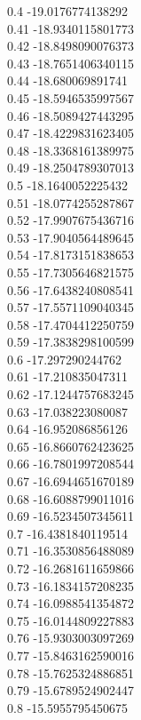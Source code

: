 {0.4	-19.0176774138292\\
0.41	-18.9340115801773\\
0.42	-18.8498090076373\\
0.43	-18.7651406340115\\
0.44	-18.680069891741\\
0.45	-18.5946535997567\\
0.46	-18.5089427443295\\
0.47	-18.4229831623405\\
0.48	-18.3368161389975\\
0.49	-18.2504789307013\\
0.5	-18.1640052225432\\
0.51	-18.0774255287867\\
0.52	-17.9907675436716\\
0.53	-17.9040564489645\\
0.54	-17.8173151838653\\
0.55	-17.7305646821575\\
0.56	-17.6438240808541\\
0.57	-17.5571109040345\\
0.58	-17.4704412250759\\
0.59	-17.3838298100599\\
0.6	-17.297290244762\\
0.61	-17.210835047311\\
0.62	-17.1244757683245\\
0.63	-17.038223080087\\
0.64	-16.952086856126\\
0.65	-16.8660762423625\\
0.66	-16.7801997208544\\
0.67	-16.6944651670189\\
0.68	-16.6088799011016\\
0.69	-16.5234507345611\\
0.7	-16.4381840119514\\
0.71	-16.3530856488089\\
0.72	-16.2681611659866\\
0.73	-16.1834157208235\\
0.74	-16.0988541354872\\
0.75	-16.0144809227883\\
0.76	-15.9303003097269\\
0.77	-15.8463162590016\\
0.78	-15.7625324886851\\
0.79	-15.6789524902447\\
0.8	-15.5955795450675\\
}
